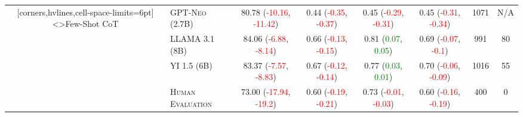 \documentclass[twocolumn]{article}
\begin{document}
\begin{sidewaystable}[ht]
\begin{NiceTabular}{cl*{6}{c}}[corners,hvlines,cell-space-limits=6pt]
<\rotate>{Few-Shot CoT}
	 & \textsc{GPT-Neo (2.7B)} & 80.78 (\textcolor{Red}{-10.16}, \textcolor{Red}{-11.42}) & 0.44 (\textcolor{Red}{-0.35}, \textcolor{Red}{-0.37}) & 0.45 (\textcolor{Red}{-0.29}, \textcolor{Red}{-0.31}) & 0.45 (\textcolor{Red}{-0.31}, \textcolor{Red}{-0.34}) & 1071 & N/A \\
	 & \textsc{LLAMA 3.1 (8B)} & 84.06 (\textcolor{Red}{-6.88}, \textcolor{Red}{-8.14}) & 0.66 (\textcolor{Red}{-0.13}, \textcolor{Red}{-0.15}) & 0.81 (\textcolor{Green}{0.07}, \textcolor{Green}{0.05}) & 0.69 (\textcolor{Red}{-0.07}, \textcolor{Red}{-0.1}) & 991 & 80 \\
	 & \textsc{YI 1.5 (6B)} & 83.37 (\textcolor{Red}{-7.57}, \textcolor{Red}{-8.83}) & 0.67 (\textcolor{Red}{-0.12}, \textcolor{Red}{-0.14}) & 0.77 (\textcolor{Green}{0.03}, \textcolor{Green}{0.01}) & 0.70 (\textcolor{Red}{-0.06}, \textcolor{Red}{-0.09}) & 1016 & 55 \\

	 & \textsc{Human Evaluation} & 73.00 (\textcolor{Red}{-17.94}, \textcolor{Red}{-19.2}) & 0.60 (\textcolor{Red}{-0.19}, \textcolor{Red}{-0.21}) & 0.73 (\textcolor{Red}{-0.01}, \textcolor{Red}{-0.03}) & 0.60 (\textcolor{Red}{-0.16}, \textcolor{Red}{-0.19}) & 400 & 0 \\

\end{NiceTabular}
\end{sidewaystable}
\end{document}
